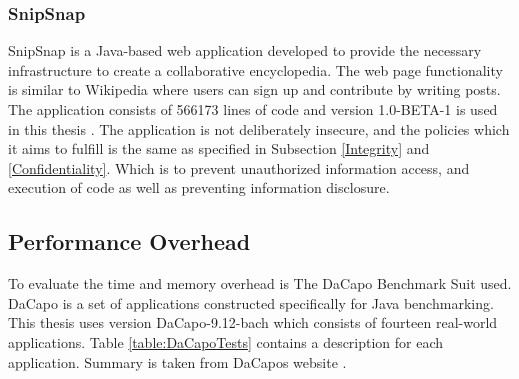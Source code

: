 \subsubsection{SnipSnap}
SnipSnap is a Java-based web application developed to provide the necessary infrastructure to create a collaborative encyclopedia. The web page functionality is similar to Wikipedia \parencite{wikipedia} where users can sign up and contribute by writing posts. The application consists of 566173 lines of code and version 1.0-BETA-1 is used in this thesis \parencite{snipsnap}. The application is not deliberately insecure, and the policies which it aims to fulfill is the same as specified in Subsection \ref{Integrity} and \ref{Confidentiality}. Which is to prevent unauthorized information access, and execution of code as well as preventing information disclosure.



\subsection{Performance Overhead}
To evaluate the time and memory overhead is The DaCapo Benchmark Suit \parencite{dacapo} used. DaCapo is a set of applications constructed specifically for Java benchmarking. This thesis uses version DaCapo-9.12-bach which consists of fourteen real-world applications. Table \ref{table:DaCapoTests} contains a description for each application. Summary is taken from DaCapos website \parencite{dacapoBench}.

